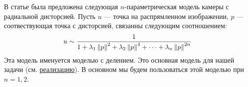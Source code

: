 \label{model}
В статье \cite{Fitzgibbon01b} была предложена следующая $n$-параметрическая модель камеры с радиальной дисторсией. Пусть $u$ --- точка на распрямленном изображении, $p$ --- соотвествующая точка с дисторсией, связанны следующим соотношением:
\begin{equation}
	u \sim \frac{1}{1 + \lambda_1\left\lVert p\right\rVert^2 + \lambda_2\left\lVert p\right\rVert^4 + \cdots + \lambda_n\left\lVert p\right\rVert^{2n}}
\end{equation} 
Эта модель именуется моделью с делением. Это основная модель для нашей задачи (см. \href{https://github.com/QuantumMechanicus/camera_calibration/blob/dev/core/scene/Intrinsics.h}{реализацию}). В основном мы будем пользоваться этой моделью при $n = 1, 2$.

